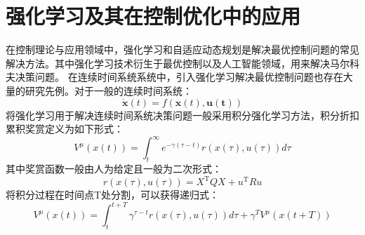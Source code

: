 \section{强化学习及其在控制优化中的应用}
在控制理论与应用领域中，强化学习\cite{Sutton2018}和自适应动态规划\cite{powell2007approximate,zhang2012adaptive}是解决最优控制问题的常见解决方法。其中强化学习技术衍生于最优控制以及人工智能领域，用来解决马尔科夫决策问题。
在连续时间系统系统中，引入强化学习解决最优控制问题也存在大量的研究先例。对于一般的连续时间系统：
\begin{equation}
    \dot{\mathbf{x}}(t)=f(\mathbf{x}(t), \mathbf{u}(\mathbf{t}))
\end{equation}
将强化学习用于解决连续时间系统决策问题一般采用积分强化学习方法，积分折扣累积奖赏定义为如下形式：
\begin{equation}
    V^\mu(x(t))=\int_t^{\infty} e^{-\gamma(\tau-t)} r(x(\tau), u(\tau)) d \tau
 \end{equation}
其中奖赏函数一般由人为给定且一般为二次形式：
 \begin{equation}
    r(x(\tau), u(\tau))=X^{\mathrm{T}} Q X+u^{\mathrm{T}} R u
\end{equation}
将积分过程在时间点T处分割，可以获得递归式：
\begin{equation}
    V^\mu(x(t))=\int_t^{t+T} \gamma^{\tau-t} r(x(\tau), u(\tau)) d \tau+\gamma^T V^\mu(x(t+T))
    \end{equation}


